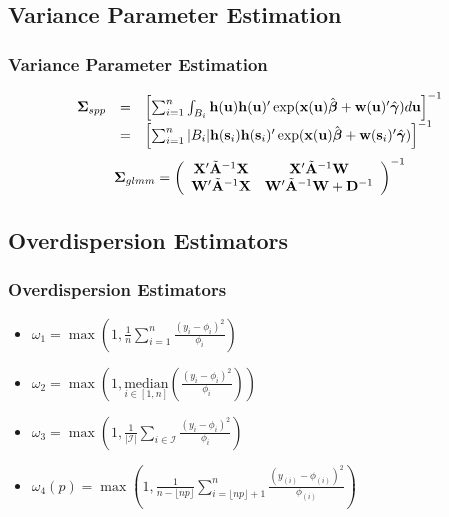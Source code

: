 \documentclass[mathserif,compress]{beamer}
\def\bit{\begin{itemize}}
\def\eit{\end{itemize}}
\def\bdm{\begin{displaymath}}
\def\edm{\end{displaymath}}
\def\bh{\mathbf{h}}
\def\bs{\mathbf{s}}
\def\bu{\mathbf{u}}
\def\bw{\mathbf{w}}
\def\bx{\mathbf{x}}
\def\bA{\mathbf{A}}
\def\bD{\mathbf{D}}
\def\bW{\mathbf{W}}
\def\bX{\mathbf{X}}
\def\cI{\mathcal{I}}
\def\bbeta{\mbox{\boldmath $\beta$}}
\def\bgamma{\mbox{\boldmath $\gamma$}}
\def\bSigma{\mbox{\boldmath $\Sigma$}}
\def\median{\textrm{median}}
\begin{document}
\subsection{Variance Parameter Estimation}
\begin{frame} 
\frametitle{Variance Parameter Estimation}

\hspace{-.6cm}
	\bdm
		\begin{array} {r c l}
			\bSigma_{spp} &=& \left[\sum_{i=1}^n\int_{B_i} \bh(\bu)
				\bh({\bu})^\prime\exp(\bx(\bu)\hat{\bbeta} + 
				\bw(\bu)^\prime\hat{\bgamma}) d\bu\right]^{-1} \\
				&=& \left[\sum_{i=1}^n |B_i|\bh(\bs_i)\bh({\bs_i})^\prime\exp(\bx(\bu)\hat{\bbeta} + 
					\bw(\bs_i)^\prime\hat{\bgamma}) \right]^{-1}
		\end{array}
	\edm \pause
	\vspace{.5cm}
	\bdm
		\bSigma_{glmm} = \left(
		\begin{array} {c c} 
			\bX^\prime \tilde{\bA}^{-1} \bX & \bX^\prime \tilde{\bA}^{-1} \bW \\
			\bW^\prime \tilde{\bA}^{-1} \bX & \bW^\prime \tilde{\bA}^{-1} \bW + \bD^{-1}
		\end{array}
		\right)^{-1}
	\edm

\end{frame}


\subsection{Overdispersion Estimators}
\begin{frame} 
\frametitle{Overdispersion Estimators}
	\bit
		\item $\omega_1 = \max\left(1, \frac{1}{n}\sum_{i=1}^n
			\frac{(y_i-\phi_i)^2}{\phi_i}\right)$ \pause
				\vspace{0.3cm}       
		\item $\omega_2 = \max\left(1, \underset{i \in [1,n]}{\median}
			\left(\frac{(y_i-\phi_i)^2}{\phi_i}\right)\right)$ \pause
				\vspace{0.3cm}       
		\item $\omega_3 = \max\left(1, \frac{1}{|\cI|}\sum_{i \in \cI}
			\frac{(y_i-\phi_i)^2}{\phi_i}\right)$ \pause
				\vspace{0.3cm}       
		\item $\omega_4(p) = \max\left(1, \frac{1}{n - \lfloor np \rfloor}
			\sum_{i = \lfloor np \rfloor + 1}^n\frac{(y_{(i)}-\phi_{(i)})^2}{\phi_{(i)}}\right)$ 
	\eit
\end{frame}
\end{document}
